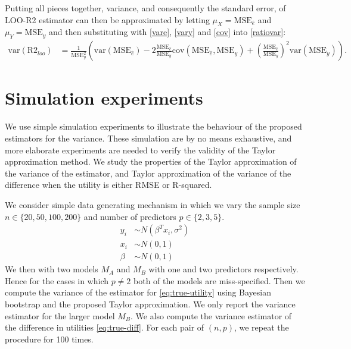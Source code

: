 \documentclass{article}
\begin{document}
 Putting all pieces together, variance, and consequently the standard error, of LOO-R2 estimator can then be approximated by letting $\mu_X = \text{MSE}_{\hat{e}}$ and $\mu_Y = \text{MSE}_y$ and then substituting with \eqref{vare}, \eqref{vary} and \eqref{cov} into \eqref{ratiovar}:
 \begin{align}
     \text{var}(\text{R2}_{loo}) &= \frac{1}{\text{MSE}_y^2} \left( \text{var}(\text{MSE}_{\hat{e}}) - 2 \frac{\text{MSE}_{\hat{e}}}{\text{MSE}_y} \text{cov}(\text{MSE}_{\hat{e}}, \text{MSE}_{y} ) +  \left( \frac{\text{MSE}_{\hat{e}}}{\text{MSE}_y} \right)^2 \text{var}(\text{MSE}_y) \right) \label{eq:var-loo-r2}.
 \end{align}
 
\section{Simulation experiments}
We use simple simulation experiments to illustrate the behaviour of the proposed estimators for the variance. These simulation are by no means exhaustive, and more elaborate experiments are needed to verify the validity of the Taylor approximation method. We study the properties of the Taylor approximation of the variance of the estimator, and Taylor approximation of the variance of the difference when the utility is either RMSE or R-squared.

We consider simple data generating  mechanism in which we vary the sample size $n \in \{20, 50, 100, 200 \}$ and number of predictors $p \in \{ 2, 3, 5 \}$.
\begin{equation*}
    \begin{aligned}
    y_i &\sim N(\beta^T x_i, \sigma^2) \\
    x_i &\sim N(0, 1) \\
    \beta &\sim N(0, 1)
    \end{aligned}
\end{equation*}
We then with two models $M_A$ and $M_B$ with one and two predictors respectively. Hence for the cases in which $p \neq 2$ both of the models are miss-specified. Then we compute the variance of the estimator for \eqref{eq:true-utility} using Bayesian bootstrap and the proposed Taylor approximation. We only report the variance estimator for the larger model $M_B$. We also compute the variance estimator of the difference in utilities \eqref{eq:true-diff}. For each pair of $(n, p)$, we repeat the procedure for 100 times.
\end{document}

